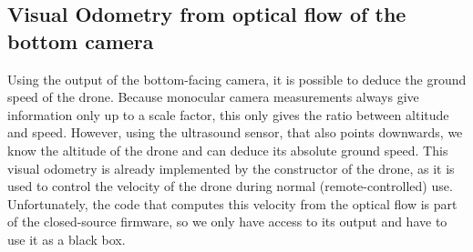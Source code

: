 \subsection{Visual Odometry from optical flow of the bottom camera} \label{sec:opticalflow}
Using the output of the bottom-facing camera, it is possible to deduce the ground speed of the drone. Because monocular camera measurements always give information only up to a scale factor, this only gives the ratio between altitude and speed. However, using the ultrasound sensor, that also points downwards, we know the altitude of the drone and can deduce its absolute ground speed. This visual odometry is already implemented by the constructor of the drone, as it is used to control the velocity of the drone during normal (remote-controlled) use. Unfortunately, the code that computes this velocity from the optical flow is part of the closed-source firmware, so we only have access to its output and have to use it as a black box.

